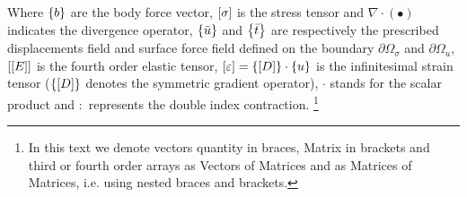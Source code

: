 Where $\left\lbrace{b}\right \rbrace$ are the body force vector, $\left[{\sigma}\right]$ is the stress tensor and $\nabla \cdot (\bullet)$ indicates the divergence operator, $\left\lbrace{\bar{u}}\right \rbrace$ and $\left\lbrace{\bar{t}}\right \rbrace$ are respectively the prescribed displacements field and surface force field defined on the boundary $ \partial \Omega_{\sigma}$ and $ \partial \Omega_{u}$, $\left[{\left[{E}\right]}\right]$ is the fourth order elastic tensor, $\left[{\varepsilon}\right] = \left\lbrace{\ensuremath\left[{D}\right]}\right \rbrace \cdot\left\lbrace{u}\right \rbrace $ is the infinitesimal strain tensor ($\left\lbrace{\ensuremath\left[{D}\right]}\right \rbrace$ denotes the symmetric gradient operator), $\cdot$ stands for the scalar product and $:$ represents the double index contraction. \footnote{In this text we denote vectors quantity in braces, Matrix in brackets and third or fourth order arrays as Vectors of Matrices and as Matrices of Matrices, i.e. using nested braces and brackets.}\\

